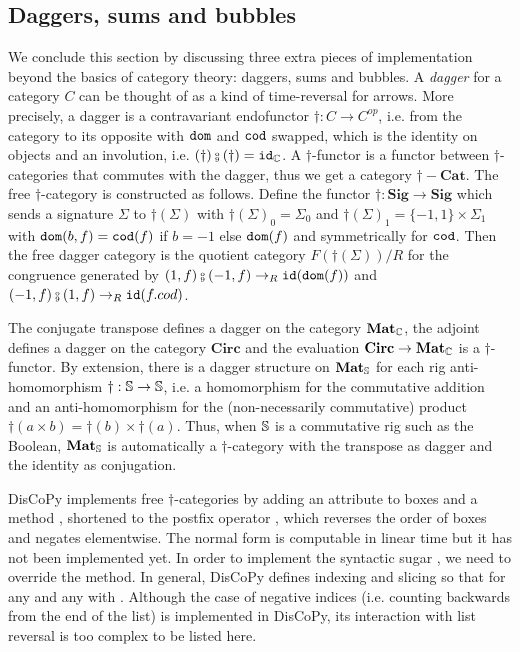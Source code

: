 \subsection{Daggers, sums and bubbles}\label{subsection:dagger-sums-bubbles}

We conclude this section by discussing three extra pieces of implementation beyond the basics of category theory: daggers, sums and bubbles.
A \emph{dagger} for a category $C$ can be thought of as a kind of time-reversal for arrows.
More precisely, a dagger is a contravariant endofunctor $\dagger : C \to C^{op}$, i.e. from the category to its opposite with $\dom$ and $\cod$ swapped, which is the identity on objects and an involution, i.e. $(\dagger) \fcmp (\dagger) = \id_\C$.
A $\dagger$-functor is a functor between $\dagger$-categories that commutes with the dagger, thus we get a category $\dagger-\mathbf{Cat}$.
The free $\dagger$-category is constructed as follows.
Define the functor $\dagger : \mathbf{Sig} \to \mathbf{Sig}$ which sends a signature $\Sigma$ to $\dagger(\Sigma)$ with
$\dagger(\Sigma)_0 = \Sigma_0$ and $\dagger(\Sigma)_1 = \{ -1, 1 \} \times \Sigma_1$ with $\dom(b, f) = \cod(f)$ if $b = -1$ else $\dom(f)$ and symmetrically for $\cod$.
Then the free dagger category is the quotient category $F(\dagger(\Sigma)) / R$ for the congruence generated by $(1, f) \fcmp (-1, f) \to_R \id(\dom(f))$ and $(-1, f) \fcmp (1, f) \to_R \id(f.cod)$.

\begin{example}
The conjugate transpose defines a dagger on the category $\mathbf{Mat}_\C$, the adjoint defines a dagger on the category $\mathbf{Circ}$ and the evaluation $\mathbf{Circ} \to \mathbf{Mat}_\C$ is a $\dagger$-functor.
By extension, there is a dagger structure on $\mathbf{Mat}_\S$ for each rig anti-homomorphism $\dagger : \S \to \S$, i.e. a homomorphism for the commutative addition and an anti-homomorphism for the (non-necessarily commutative) product $\dagger(a \times b) = \dagger(b) \times \dagger(a)$.
Thus, when $\S$ is a commutative rig such as the Boolean, $\mathbf{Mat}_\S$ is automatically a $\dagger$-category with the transpose as dagger and the identity as conjugation.
\end{example}

DisCoPy implements free $\dagger$-categories by adding an attribute  to boxes and a method , shortened to the postfix operator \py{[::-1]}, which reverses the order of boxes and negates  elementwise.
The normal form is computable in linear time but it has not been implemented yet.
In order to implement the syntactic sugar , we need to override the  method.
In general, DisCoPy defines indexing  and slicing  so that  for any  and any  with .
Although the case of negative indices (i.e. counting backwards from the end of the list) is implemented in DisCoPy, its interaction with list reversal is too complex to be listed here.


